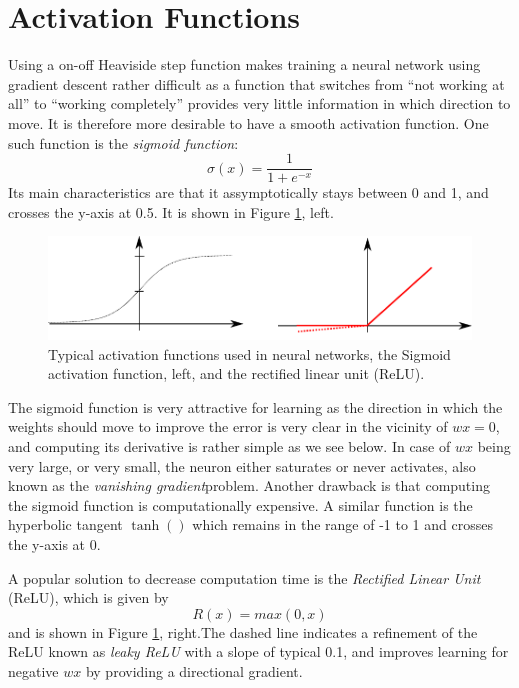 \documentclass[paper=6.14in:9.21in,pagesize=pdftex,11pt,twoside,openright]{scrbook}
\begin{document}
\section{Activation Functions}
Using a on-off Heaviside step function makes training a neural network using gradient descent rather difficult as a function that switches from ``not working at all'' to ``working completely'' provides very little information in which direction to move. It is therefore more desirable to have a smooth activation function. One such function is the \emph{sigmoid function}:
\begin{equation}
\sigma(x)=\frac{1}{1+e^{-x}}
\end{equation}
Its main characteristics are that it assymptotically stays between 0 and 1, and crosses the y-axis at 0.5. It is shown in Figure \ref{fig:activationfunctions}, left. 

\begin{figure}[!htb]
\centering
\includegraphics[width=0.9\columnwidth]{figs/activationfunctions}
\caption{Typical activation functions used in neural networks, the Sigmoid activation function, left, and the rectified linear unit (ReLU).\label{fig:activationfunctions}}
\end{figure}

The sigmoid function is very attractive for learning as the direction in which the weights should move to improve the error is very clear in the vicinity of $wx=0$, and computing its derivative is rather simple as we see below. In case of $wx$ being very large, or very small, the neuron either saturates or never activates, also known as the \emph{vanishing gradient}problem. Another drawback is that computing the sigmoid function is computationally expensive. A similar function is the hyperbolic tangent $\tanh()$ which remains in the range of -1 to 1 and crosses the y-axis at 0.

A popular solution to decrease computation time is the \emph{Rectified Linear Unit} (ReLU), which is given by
\begin{equation}
R(x)=max(0,x)
\end{equation}
and is shown in Figure \ref{fig:activationfunctions}, right.The dashed line indicates a refinement of the ReLU known as \emph{leaky ReLU} with a slope of typical 0.1, and improves learning for negative $wx$ by providing a directional gradient. 
\end{document}

